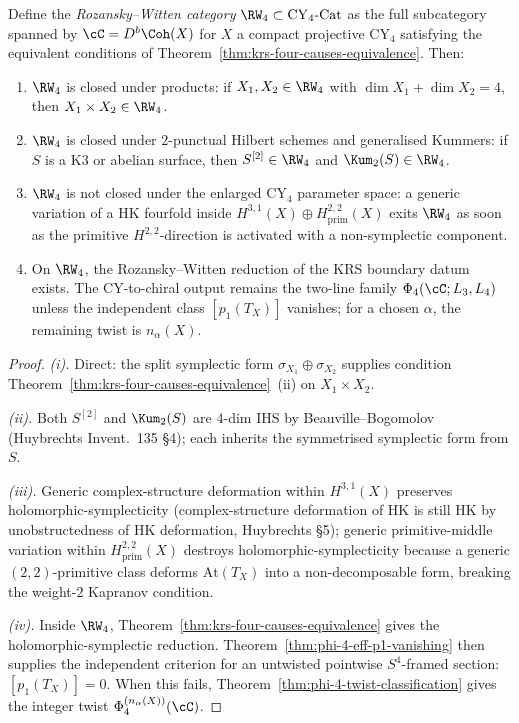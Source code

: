\begin{theorem}
\label{thm:rw-category-cy4}
%
Define the \emph{Rozansky--Witten category} $\RW_4 \subset
\mathrm{CY}_4\text{-Cat}$ as the full subcategory spanned by
$\cC = D^b\Coh(X)$ for $X$ a compact projective CY${}_4$ satisfying
the equivalent conditions of
Theorem~\ref{thm:krs-four-causes-equivalence}. Then:
\begin{enumerate}[label=\textup{(}\roman*\textup{)}]
 \item $\RW_4$ is closed under products: if $X_1, X_2 \in \RW_4$
 with $\dim X_1 + \dim X_2 = 4$, then $X_1 \times X_2 \in \RW_4$.
 \item $\RW_4$ is closed under $2$-punctual Hilbert schemes and
 generalised Kummers: if $S$ is a K$3$ or abelian surface, then
 $S^{[2]} \in \RW_4$ and $\Kum_2(S) \in \RW_4$.
 \item \(\RW_4\) is not closed under the enlarged CY${}_4$ parameter space:
 a generic variation of a HK fourfold inside
 \(H^{3,1}(X)\oplus H^{2,2}_{\mathrm{prim}}(X)\) exits \(\RW_4\) as soon
 as the primitive \(H^{2,2}\)-direction is activated with a non-symplectic
 component.
 \item On \(\RW_4\), the Rozansky--Witten reduction of the KRS boundary
 datum exists. The CY-to-chiral output remains the two-line family
 \(\Phi_4(\cC;L_3,L_4)\) unless the independent class \([p_1(T_X)]\) vanishes;
 for a chosen \(\alpha\), the remaining twist is \(n_\alpha(X)\).
\end{enumerate}
\end{theorem}

\begin{proof}
\emph{(i).} Direct: the split symplectic form $\sigma_{X_1} \oplus
\sigma_{X_2}$ supplies condition
Theorem~\ref{thm:krs-four-causes-equivalence}~(ii) on $X_1 \times X_2$.

\emph{(ii).} Both $S^{[2]}$ and $\Kum_2(S)$ are $4$-dim IHS by
Beauville--Bogomolov \textup{(}Huybrechts Invent.~135 \S 4\textup{);} each
inherits the symmetrised symplectic form from $S$.

\emph{(iii).} Generic complex-structure deformation within \(H^{3,1}(X)\) preserves
holomorphic-symplecticity (complex-structure deformation of HK is
still HK by unobstructedness of HK deformation, Huybrechts \S 5);
generic primitive-middle variation within \(H^{2,2}_{\mathrm{prim}}(X)\) destroys
holomorphic-symplecticity because a generic $(2,2)$-primitive class
deforms $\mathrm{At}(T_X)$ into a non-decomposable form, breaking
the weight-$2$ Kapranov condition.

\emph{(iv).} Inside \(\RW_4\), Theorem~\ref{thm:krs-four-causes-equivalence}
gives the holomorphic-symplectic reduction. Theorem~\ref{thm:phi-4-eff-p1-vanishing}
then supplies the independent criterion for an untwisted pointwise
\(S^4\)-framed section: \([p_1(T_X)]=0\). When this fails,
Theorem~\ref{thm:phi-4-twist-classification} gives the integer twist
\(\Phi_4^{(n_\alpha(X))}(\cC)\).
\end{proof}

